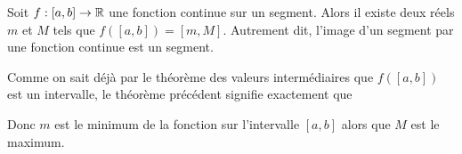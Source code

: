 \documentclass[class=report,crop=false]{standalone}
\begin{document}
\begin{theoreme}
Soit $f:[a,b]\to\mathbb{R}$ une fonction continue sur un segment.
Alors il existe deux réels $m$ et $M$ tels que $f([a,b])=[m,M]$.
Autrement dit, l'image d'un segment par une fonction continue est un segment.
\end{theoreme}



Comme on sait déjà par le théorème des valeurs intermédiaires que
$f([a,b])$ est un intervalle, le théorème précédent signifie exactement que

Donc $m$ est le minimum de la fonction sur l'intervalle $[a,b]$ alors que $M$ est le maximum.
\end{document}

